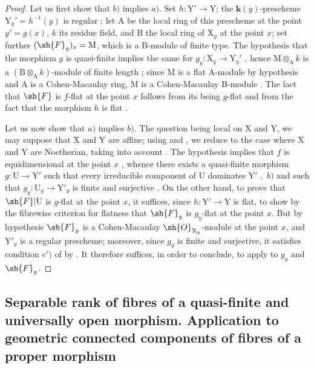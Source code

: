 \begin{proof}
\label{IV.15.4.3-proof}
Let us first show that $b)$ implies $a)$.
Set $h:\mathrm{Y}'\to\mathrm{Y}$; the $\mathbf{k}(y)$-prescheme $\mathrm{Y}_y'=h^{-1}(y)$ is regular ; let $\mathrm{A}$ be the local ring of this prescheme at the point $y'=g(x)$, $k$ its residue field, and $\mathrm{B}$ the local ring of $\mathrm{X}_y$ at the point $x$; set further $(\sh{F}_y)_x=\mathrm{M}$, which is a $\mathrm{B}$-module of finite type.
The hypothesis that the morphism $g$ is quasi-finite implies the same for $g_y:\mathrm{X}_y\to\mathrm{Y}_y'$ , hence $\mathrm{M}\otimes_\mathrm{A} k$ is a $(\mathrm{B}\otimes_\mathrm{A} k)$-module of finite length ; since $\mathrm{M}$ is a flat $\mathrm{A}$-module by hypothesis and $\mathrm{A}$ is a Cohen-Macaulay ring, $\mathrm{M}$ is a Cohen-Macaulay $\mathrm{B}$-module .
The fact that $\sh{F}$ is $f$-flat at the point $x$ follows from its being $g$-flat and from the fact that the morphism $h$ is flat .

Let us now show that $a)$ implies $b)$.
The question being local on $\mathrm{X}$ and $\mathrm{Y}$, we may suppose that $\mathrm{X}$ and $\mathrm{Y}$ are affine; using  and , we reduce to the case where $\mathrm{X}$ and $\mathrm{Y}$ are Noetherian, taking into account .
The hypothesis implies that $f$ is equidimensional at the point $x$ , whence there exists a quasi-finite morphism $g:\mathrm{U}\to\mathrm{Y}'$ such that every irreducible component of $\mathrm{U}$ dominates $\mathrm{Y}'$ ,~$b)$ and such that $g_y:\mathrm{U}_y\to\mathrm{Y}'_y$ is finite and surjective .
On the other hand, to prove that $\sh{F}|\mathrm{U}$ is $g$-flat at the point $x$, it suffices, since $h:\mathrm{Y}'\to\mathrm{Y}$ is flat, to show by the fibrewise criterion for flatness  that $\sh{F}_y$ is $g_y$-flat at the point $x$.
But by hypothesis $\sh{F}_y$ is a Cohen-Macaulay $\sh{O}_{\mathrm{X}_y}$-module at the point $x$, and $\mathrm{Y}'_y$ is a regular prescheme; moreover, since $g_y$ is finite and surjective, it satisfies condition $e')$ of  by .
It therefore suffices, in order to conclude, to apply  to $g_y$ and $\sh{F}_y$.
\end{proof}
\subsection{Separable rank of fibres of a quasi-finite and universally open morphism. Application to geometric connected components of fibres of a proper morphism}
\label{subsection:IV.15.5}

